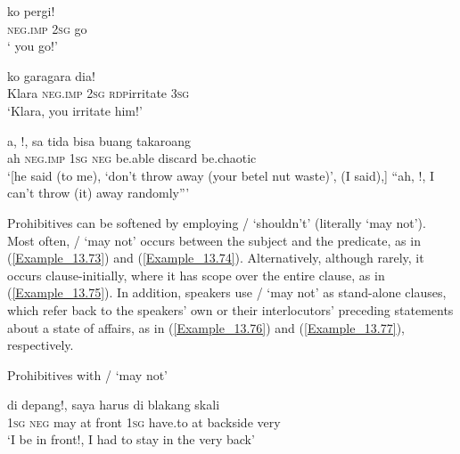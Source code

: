 \ea
\label{Example_13.70}
 {ko} {pergi!}\\ %
 \textsc{neg.imp}  \textsc{2sg}  go\\
\glt 
‘ you go!’ \textstyleExampleSource{[081025-006-Cv.0192]}
\z

\ea
\label{Example_13.71}
 {} {ko} {gara{\Tilde}gara} {dia!}\\ %
 Klara  \textsc{neg.imp}  \textsc{2sg}  \textsc{rdp}{\Tilde}irritate  \textsc{3sg}\\
\glt 
‘Klara,  you irritate him!’ \textstyleExampleSource{[080917-003b-CvEx.0027]}
\z

\ea
\label{Example_13.72}
\gll {\ldots} {a,} {!,} {sa} {tida} {bisa} {buang} {takaroang}\\ %
  {} ah  \textsc{neg.imp}  \textsc{1sg}  \textsc{neg}  be.able  discard  be.chaotic\\
\glt 
‘[he said (to me), ‘don’t throw away (your betel nut waste)’, (I said),] ``ah, !, I can’t throw (it) away randomly''' \textstyleExampleSource{[081025-008-Cv.0012]}
\z


Prohibitives can be softened by employing / ‘shouldn’t’ (literally ‘may not’). Most often, / ‘may not’ occurs between the subject and the predicate, as in (\ref{Example_13.73}) and (\ref{Example_13.74}). Alternatively, although rarely, it occurs clause-initially, where it has scope over the entire clause, as in (\ref{Example_13.75}). In addition, speakers use / ‘may not’ as stand-alone clauses, which refer back to the speakers’ own or their interlocutors’ preceding statements about a state of affairs, as in (\ref{Example_13.76}) and (\ref{Example_13.77}), respectively.


\begin{styleExampleTitle}
Prohibitives with / ‘may not’
\end{styleExampleTitle}

\ea
\label{Example_13.73}
 {} {} {di} {depang!,} {saya} {harus} {di} {blakang} {skali}\\ %
 \textsc{1sg}  \textsc{neg}  may  at  front  \textsc{1sg}  have.to  at  backside  very\\
\glt 
‘I  be in front!, I had to stay in the very back’ \textstyleExampleSource{[081029-005-Cv.0133]}
\z

